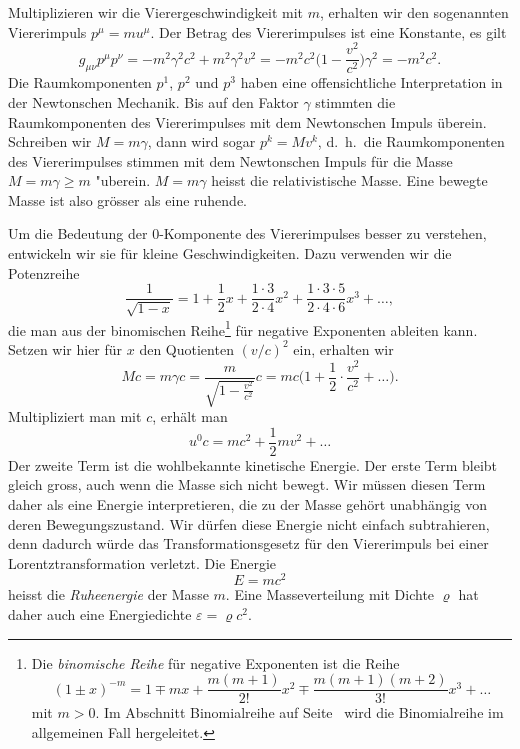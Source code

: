 Multiplizieren wir die Vierergeschwindigkeit mit $m$, erhalten wir
den sogenannten Viererimpuls $p^\mu = mu^\mu$.
Der Betrag des Viererimpulses ist eine Konstante, es gilt
\[
g_{\mu\nu}p^\mu p^\nu
=
-
m^2\gamma^2 c^2
+
m^2 \gamma^2 v^2
=
-m^2c^2\biggl(\displaystyle 1-\frac{v^2}{c^2}\biggr)\gamma^2
=
-m^2c^2.
\]
Die Raumkomponenten $p^1$, $p^2$ und $p^3$ haben eine offensichtliche
Interpretation in der Newtonschen Mechanik.
Bis auf den Faktor $\gamma$ stimmten die Raumkomponenten des Viererimpulses
mit dem Newtonschen Impuls überein.
Schreiben wir $M=m\gamma$, dann wird sogar $p^k = M v^k$, d.~h.~die
Raumkomponenten des Viererimpulses stimmen mit dem Newtonschen Impuls 
für die Masse $M=m\gamma  \ge m$ "uberein.
$M=m\gamma$ heisst die relativistische Masse.
Eine bewegte Masse ist also grösser als eine ruhende.

Um die Bedeutung der $0$-Komponente des Viererimpulses besser zu
verstehen, entwickeln wir sie für kleine Geschwindigkeiten.
Dazu verwenden wir die Potenzreihe
\[
\frac1{\sqrt{1-x}}
=
1+\frac12x+\frac{1\cdot 3}{2\cdot 4}x^2 + \frac{1\cdot 3\cdot 5}{2\cdot 4\cdot 6}x^3+\dots,
\]
die man aus der binomischen Reihe\footnote{%
Die {\em binomische Reihe} für negative Exponenten ist die Reihe
\[
(1\pm x)^{-m}
=
1\mp mx +\frac{m(m+1)}{2!}x^2 \mp \frac{m(m+1)(m+2)}{3!} x^3 +\dots
\]
mit $m>0$.
%
Im Abschnitt Binomialreihe auf Seite~\pageref{skript:multipol:binomialreihe}
wird die Binomialreihe im allgemeinen Fall hergeleitet.
} für negative Exponenten ableiten kann.
Setzen wir hier für $x$ den Quotienten $(v/c)^2$ ein, erhalten wir
\[
Mc
=
m\gamma c
=
\frac{m}{\sqrt{1-\displaystyle\frac{v^2}{c^2}}} c
=
mc\biggl(1+\frac12\cdot\frac{v^2}{c^2}+\dots\biggl).
\]
Multipliziert man mit $c$, erhält man 
\[
u^0c = mc^2 + \frac12mv^2+\dots
\]
Der zweite Term ist die wohlbekannte kinetische Energie.
Der erste Term bleibt gleich gross, auch wenn die Masse sich
nicht bewegt.
Wir müssen diesen Term daher als eine Energie interpretieren, die
zu der Masse gehört unabhängig von deren Bewegungszustand.
Wir dürfen diese Energie nicht einfach subtrahieren, denn dadurch
würde das Transformationsgesetz für den Viererimpuls bei einer
Lorentztransformation verletzt.
Die Energie
\begin{equation}
E=mc^2
\label{E=mc2}
\end{equation}
heisst die {\em Ruheenergie} der Masse $m$.
%
Eine Masseverteilung mit Dichte $\varrho$ hat daher auch
eine Energiedichte $\varepsilon=\varrho c^2$.

